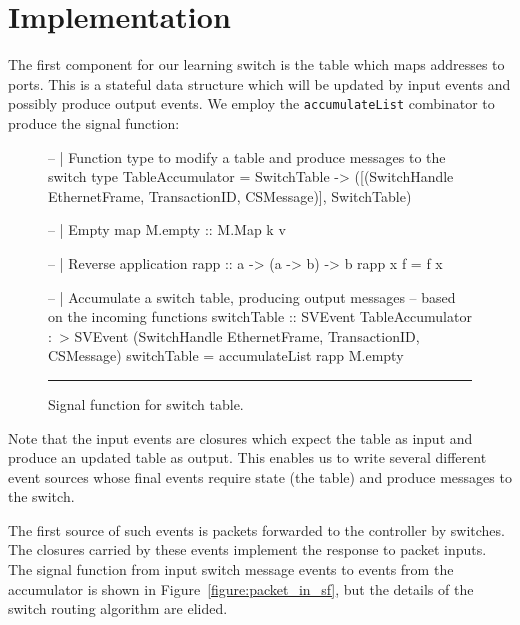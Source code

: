 \section{Implementation}
\label{section:Example_Application-Implementation}

The first component for our learning switch is the table which maps addresses
to ports. This is a stateful data structure which will be updated by input
events and possibly produce output events. We employ the {\tt accumulateList}
combinator to produce the signal function:

\begin{figure}
\begin{code}
-- | Function type to modify a table and produce messages to the switch
type TableAccumulator = 
     SwitchTable 
  -> ([(SwitchHandle EthernetFrame,
        TransactionID,
        CSMessage)],
      SwitchTable)

-- | Empty map
M.empty :: M.Map k v

-- | Reverse application
rapp :: a -> (a -> b) -> b
rapp x f = f x

-- | Accumulate a switch table, producing output messages
--   based on the incoming functions
switchTable ::    SVEvent TableAccumulator
              :~> SVEvent (SwitchHandle EthernetFrame,
                           TransactionID,
                           CSMessage)
switchTable = accumulateList rapp M.empty
\end{code}
\hrule
\caption{Signal function for switch table.}
\label{figure:switch_table_sf}
\end{figure}

Note that the input events are closures which expect the table as input and
produce an updated table as output. This enables us to write several different
event sources whose final events require state (the table) and produce
messages to the switch.

The first source of such events is packets forwarded to the controller by
switches. The closures carried by these events implement the response to
packet inputs. The signal function from input switch message events to events
from the accumulator is shown in Figure~\ref{figure:packet_in_sf}, but the
details of the switch routing algorithm are elided.

